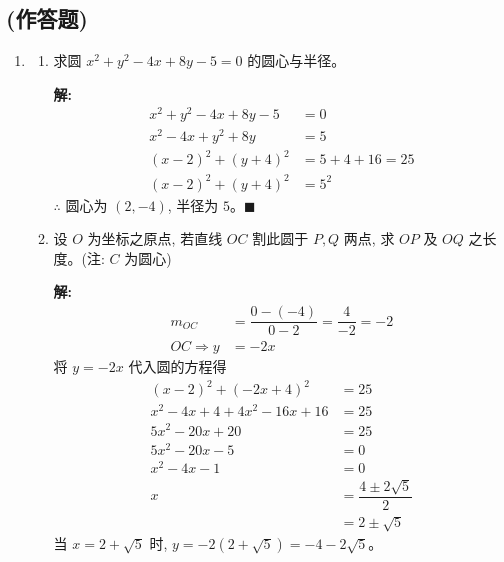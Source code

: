 \documentclass[10pt]{article}
\newcommand{\sol}{\textbf{解:} }
\begin{document}
\subsection*{(作答题)}
\begin{enumerate}[leftmargin=*]
  \item \begin{enumerate}
          \item 求圆 $x^{2}+y^{2}-4 x+8 y-5=0$ 的圆心与半径。

                \sol{}
                \begin{align*}
                  x^{2}+y^{2}-4 x+8 y-5 & = 0               \\
                  x^{2}-4x+y^{2}+8y     & = 5               \\
                  (x-2)^{2}+(y+4)^{2}   & = 5 + 4 + 16 = 25 \\
                  (x-2)^{2}+(y+4)^{2}   & = 5^{2}
                \end{align*}
                $\therefore$ 圆心为 $(2, -4)$, 半径为 $5$。\hfill$\blacksquare$

          \item 设 $O$ 为坐标之原点, 若直线 $O C$ 割此圆于 $P, Q$ 两点, 求 $OP$ 及 $OQ$ 之长度。(注: $C$ 为圆心)

                \sol{}
                \begin{align*}
                  m_{OC}           & = \dfrac{0 - (-4)}{0 - 2} = \dfrac{4}{-2} = -2 \\
                  OC \Rightarrow y & = -2x
                \end{align*}
                将 $y = -2x$ 代入圆的方程得
                \begin{align*}
                  (x-2)^{2} + (-2x+4)^{2}            & = 25                         \\
                  x^{2} - 4x + 4 + 4x^{2} - 16x + 16 & = 25                         \\
                  5x^{2} - 20x + 20                  & = 25                         \\
                  5x^{2} - 20x - 5                   & = 0                          \\
                  x^{2} - 4x - 1                     & = 0                          \\
                  x                                  & = \dfrac{4 \pm 2\sqrt{5}}{2} \\
                                                     & = 2 \pm \sqrt{5}
                \end{align*}
                当 $x = 2 + \sqrt{5}$ 时, $y = -2(2 + \sqrt{5}) = -4 - 2\sqrt{5}$。


\end{enumerate}
\end{enumerate}
\end{document}
